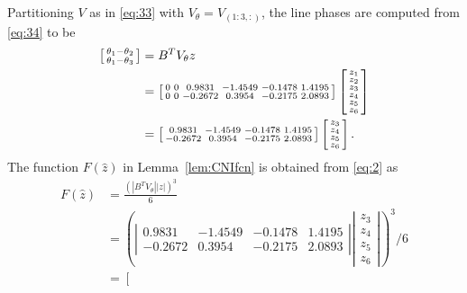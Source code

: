 \documentclass[letter, 10pt, conference]{ieeeconf}
\newcommand{\1}{\mathbf{1}}
\newcommand{\0}{\mathbf{0}}
\begin{document}
{Partitioning $V$ as in \eqref{eq:33} with $V_\theta=V_{(1:3,:)}$, 
the line phases are computed from \eqref{eq:34} to be
\begin{align*}
	\left[\begin{smallmatrix}
		\theta_1-\theta_2 \\ \theta_1-\theta_3
	\end{smallmatrix}\right]
	&=\tiny{ B^T V_\theta z }
	\\
	&=\left[\begin{smallmatrix} 
		0 & 0 & 0.9831 &-1.4549 &-0.1478 & 1.4195 \\
        0 & 0 &-0.2672 & 0.3954 &-0.2175 & 2.0893
    \end{smallmatrix}\right]
	\left[\begin{smallmatrix} 
		z_1 \\ z_2 \\ z_3 \\ z_4 \\ z_5 \\ z_6
	\end{smallmatrix}\right]
	\\
	&
	=\left[\begin{smallmatrix} 
		0.9831 &-1.4549 &-0.1478 & 1.4195 \\
        -0.2672 & 0.3954 &-0.2175 & 2.0893
    \end{smallmatrix}\right]
	\left[\begin{smallmatrix} 
		z_3 \\ z_4 \\ z_5 \\ z_6
	\end{smallmatrix}\right].
\end{align*}
The function $F(\hat{z})$ in Lemma~\ref{lem:CNIfcn} is obtained from
\eqref{eq:2} as
\begin{align*}
	  F(\hat{z})&=\frac{(|B^T V_\theta||z|)^3}{6} 
	\\
	&=\left(
	\left|\begin{smallmatrix} 
		0.9831 &-1.4549 &-0.1478 & 1.4195 \\
        -0.2672 & 0.3954 &-0.2175 & 2.0893
    \end{smallmatrix}\right|
    \left|\begin{smallmatrix} 
		z_3 \\ z_4 \\ z_5 \\ z_6
	\end{smallmatrix}\right|
	\right)^3/6 \\
    &=\left[\begin{smallmatrix} 

\end{smallmatrix}
\end{align*}}
\end{document}
